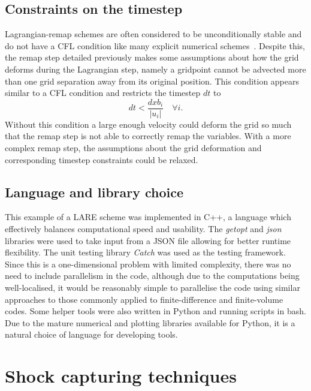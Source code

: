 \subsection{Constraints on the timestep}
Lagrangian-remap schemes are often considered to be unconditionally stable and do not have a CFL condition like many explicit numerical schemes~\cite{batesMultiplyUpstreamSemiLagrangianAdvective1982}. Despite this, the remap step detailed previously makes some assumptions about how the grid deforms during the Lagrangian step, namely a gridpoint cannot be advected more than one grid separation away from its original position. This condition appears similar to a CFL condition and restricts the timestep $dt$ to
\begin{equation}
  \label{eq:grid_condition1}
  dt < \frac{dxb_i}{|u_i|}\quad \forall i.
\end{equation}
Without this condition a large enough velocity could deform the grid so much that the remap step is not able to correctly remap the variables. With a more complex remap step, the assumptions about the grid deformation and corresponding timestep constraints could be relaxed.

\subsection{Language and library choice}
This example of a LARE scheme was implemented in C++, a language which effectively balances computational speed and usability. The \emph{getopt} and \emph{json} libraries were used to take input from a JSON file allowing for better runtime flexibility. The unit testing library \emph{Catch} was used as the testing framework. Since this is a one-dimensional problem with limited complexity, there was no need to include parallelism in the code, although due to the computations being well-localised, it would be reasonably simple to parallelise the code using similar approaches to those commonly applied to finite-difference and finite-volume codes. Some helper tools were also written in Python and running scripts in bash. Due to the mature numerical and plotting libraries available for Python, it is a natural choice of language for developing tools.

\section{Shock capturing techniques}
\label{sec:shock_capturing}

